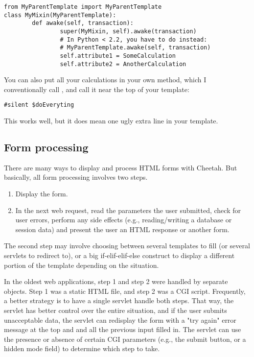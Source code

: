 \begin{verbatim}
from MyParentTemplate import MyParentTemplate
class MyMixin(MyParentTemplate):
        def awake(self, transaction):
                super(MyMixin, self).awake(transaction)
                # In Python < 2.2, you have to do instead:
                # MyParentTemplate.awake(self, transaction)
                self.attribute1 = SomeCalculation
                self.attribute2 = AnotherCalculation
\end{verbatim}

You can also put all your calculations in your own method, which I 
conventionally call , and call it near the top of your
template:
\begin{verbatim}
#silent $doEveryting
\end{verbatim}
This works well, but it does mean one ugly extra line in your template.

\subsection{Form processing}
\label{webware.form}

There are many ways to display and process HTML forms with Cheetah.
But basically, all form processing involves two steps.
\begin{enumerate}
\item{} Display the form.  
\item{} In the next web request, read the parameters the user submitted,
check for user errors, perform any side effects (e.g., reading/writing a
database or session data) and present the user an HTML response or another
form.  
\end{enumerate}

The second step may involve choosing between several templates to fill (or
several servlets to redirect to), or a big if-elif-elif-else construct to
display a different portion of the template depending on the situation.

In the oldest web applications, step 1 and step 2 were handled by separate
objects.  Step 1 was a static HTML file, and step 2 was a CGI script.
Frequently, a better strategy is to have a single servlet handle both steps.
That way, the servlet has better control over the entire situation, and if
the user submits unacceptable data, the servlet can redisplay the form with a
"try again" error message at the top and and all the previous input filled in.
The servlet can use the presence or absence of certain CGI parameters (e.g.,
the submit button, or a hidden mode field) to determine which step to take.

